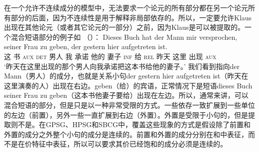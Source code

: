 在一个允许不连续成分的模型中，无法要求一个论元的所有部分都在另一个论元所有部分的后面，因为不连续性是用于解释非局部依存的。所以，一定要允许Klaus出现在其他论元（或者其它论元的一部分）之前，因为Klaus是可以被提取的。一个混合短语部分的例子如 （）：
\ea
\gll Dieses Buch hat der Mann mir versprochen, seiner Frau zu geben, der gestern hier aufgetreten ist.\\
     这   书 \textsc{aux} \textsc{det} 男人  我  承诺     他的    妻子 \textsc{inf} 给   \textsc{rel} 昨天 这里 出现 \textsc{aux}\\
\glt `昨天在这里出现的那个男人向我承诺把这本书给他的妻子。'
\z 
我们看到指向der Mann（男人）的成分，也就是关系小句der gestern hier aufgetreten ist（昨天在这里演奏的人）出现在右边。geben（给）的宾语，正常情况下是短语dieses Buch seiner Frau zu geben（这本书他妻子要给）出现在左边。所以，通常来讲，可以混合短语的部分，但是只是以一种非常受限的方式。一些依存一致扩展到一些单位的左边（前置），另外一些一直扩展到右边（外置）。外置是受限于小句的，但是提取则不是。在GPSG、HPSG和SBCG中，覆盖这些现象的方式是假设除了前置和外置的成分之外整个小句的成分是连续的。前置和外置的成分分别在\slaschc 和\extrac\citep{Keller95b,Mueller99a}中表征，而不是在价特征中表征，所以可以要求其价已经饱和的成分必须是连续的。

